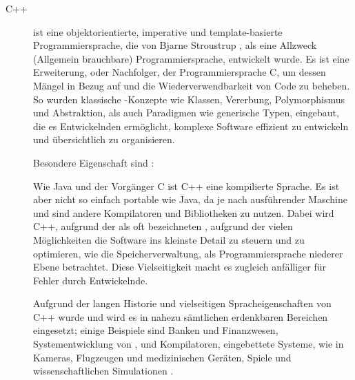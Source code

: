 \begin{description}
    \item[C++] ist eine objektorientierte, imperative und template-basierte Programmiersprache, die von Bjarne Stroustrup , als eine Allzweck (Allgemein brauchbare) Programmiersprache, entwickelt wurde.
    Es ist eine Erweiterung, oder Nachfolger, der Programmiersprache C, um dessen Mängel in Bezug auf  und die Wiederverwendbarkeit von Code zu beheben.
    So wurden klassische -Konzepte wie Klassen, Vererbung, Polymorphismus und Abstraktion, als auch Paradigmen wie generische Typen, eingebaut, die es Entwickelnden ermöglicht, komplexe Software effizient zu entwickeln und übersichtlich zu organisieren.

    Besondere Eigenschaft sind \uA:

    Wie Java und der Vorgänger C ist C++ eine kompilierte Sprache.
    Es ist aber nicht so einfach portable wie Java, da je nach ausführender Maschine und  sind andere Kompilatoren und Bibliotheken zu nutzen.
    Dabei wird C++, aufgrund der als oft bezeichneten , aufgrund der vielen Möglichkeiten die Software ins kleinste Detail zu steuern und zu optimieren, wie \zB die Speicherverwaltung, als Programmiersprache niederer Ebene betrachtet.
    Diese Vielseitigkeit macht es zugleich anfälliger für Fehler durch Entwickelnde.

    Aufgrund der langen Historie und vielseitigen Spracheigenschaften von C++ wurde und wird es in nahezu sämtlichen erdenkbaren Bereichen eingesetzt;
    einige Beispiele sind Banken und Finanzwesen, Systementwicklung von ,  und Kompilatoren, eingebettete Systeme, wie in Kameras, Flugzeugen und medizinischen Geräten, Spiele und wissenschaftlichen Simulationen .


\end{description}
